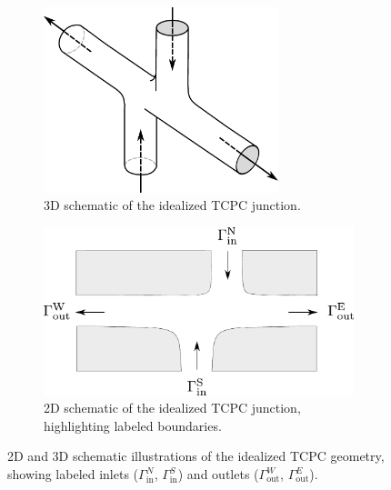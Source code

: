 \begin{figure}[H]
	\centering
	\begin{subfigure}{0.45\textwidth}
		\centering
		\includegraphics[width=0.75\textwidth, trim={0mm -13mm 0mm 0mm}]{figures/3dschema.pdf}
		\caption{3D schematic of the idealized TCPC junction.}
		\label{fig:schema 3d}
	\end{subfigure}\hspace{2mm}
	\begin{subfigure}{0.53\textwidth}
		\centering
		\includegraphics[width=0.99\textwidth, trim={0mm -5mm 0mm 0mm}]{figures/2dschema.pdf}
		\caption{2D schematic of the idealized TCPC junction, highlighting labeled boundaries.}
		\label{fig:schema 2d}
	\end{subfigure}
	\vspace{2mm}
	\caption[Schematic of Idealized TCPC Geometry]{2D and 3D schematic illustrations of the idealized TCPC geometry, showing labeled inlets ($\Gamma^{N}_{\text{in}}$, $\Gamma^{S}_{\text{in}}$) and outlets ($\Gamma^{W}_{\text{out}}$, $\Gamma^{E}_{\text{out}}$).}
	\label{fig:junction schema}
\end{figure}


